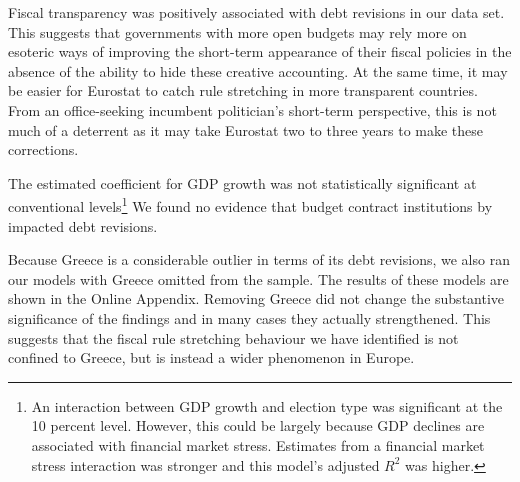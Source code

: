 \documentclass[]{article}
\begin{document}
Fiscal transparency was positively associated with debt revisions in our data set. This suggests that governments with more open budgets may rely more on esoteric ways of improving the short-term appearance of their fiscal policies in the absence of the ability to hide these creative accounting. At the same time, it may be easier for Eurostat to catch rule stretching in more transparent countries. From an office-seeking incumbent politician's short-term perspective, this is not much of a deterrent as it may take Eurostat two to three years to make these corrections.

The estimated coefficient for GDP growth was not statistically significant at conventional levels\footnote{An interaction between GDP growth and election type was significant at the 10 percent level. However, this could be largely because GDP declines are associated with financial market stress. Estimates from a financial market stress interaction was stronger and this model's adjusted $R^{2}$ was higher.} We found no evidence that budget contract institutions by impacted debt revisions.

Because Greece is a considerable outlier in terms of its debt revisions, we also ran our models with Greece omitted from the sample. The results of these models are shown in the Online Appendix. Removing Greece did not change the substantive significance of the findings and in many cases they actually strengthened. This suggests that the fiscal rule stretching behaviour we have identified is not confined to Greece, but is instead a wider phenomenon in Europe.
\end{document}
